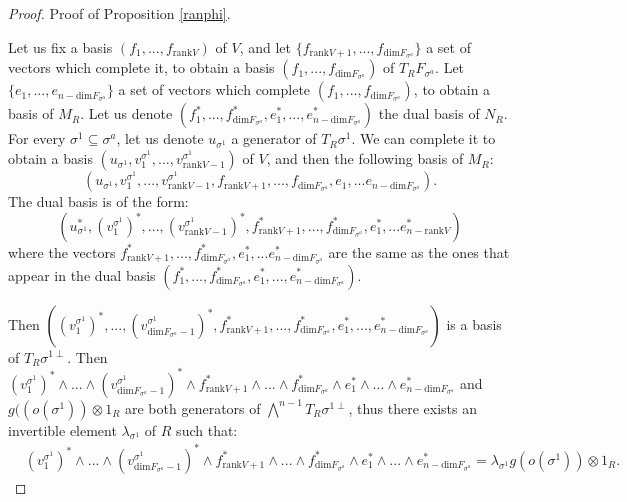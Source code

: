 \documentclass[10pt,a4paper]{amsart}
\begin{document}
\begin{proof}
    Proof of Proposition \ref{ranphi}.
    
    Let us fix a basis $(f_1,...,f_{\mathrm{rank} V})$ of $V$, and let $\{f_{\mathrm{rank}V+1},...,f_{\mathrm{dim}F_{\sigma^a}}\}$ a set of vectors which complete it, to obtain a basis $(f_1,...,f_{\mathrm{dim} F_{\sigma^a}})$ of $T_R F_{\sigma^a}$. Let $\{e_1,...,e_{n-\mathrm{dim}F_{\sigma^a}}\}$ a set of vectors which complete $(f_1,...,f_{\mathrm{dim} F_{\sigma^a}})$, to obtain a basis of $M_R$. Let us denote $(f_1^*,...,f_{\mathrm{dim} F_{\sigma^a}}^*,e_1^*,...,e_{n-\mathrm{dim} F_{\sigma^a}}^*)$ the dual basis of $N_R$. For every $\sigma^1 \subseteq \sigma^a$, let us denote $u_{\sigma^1}$ a generator of $T_R\sigma^1$. We can complete it to obtain a basis $(u_{\sigma^1},v_1^{\sigma^1},...,v_{\mathrm{rank}V -1}^{\sigma^1})$ of $V$, and then the following basis of $M_R$:
    \begin{equation*}
        (u_{\sigma^1},v_1^{\sigma^1},...,v_{\mathrm{rank}V -1}^{\sigma^1},f_{\mathrm{rank}V+1},...,f_{\mathrm{dim}F_{\sigma^a}},e_1,...e_{n-\mathrm{dim}F_{\sigma^a}}).
    \end{equation*}
    The dual basis is of the form:
    \begin{equation*}
        (u_{\sigma^1}^*,(v_1^{\sigma^1})^*,...,(v_{\mathrm{rank}V -1}^{\sigma^1})^*,f_{\mathrm{rank}V+1}^*,...,f_{\mathrm{dim}F_{\sigma^a}}^*,e_1^*,...e_{n-\mathrm{rank}V}^*)
    \end{equation*}
    where the vectors $f_{\mathrm{rank}V+1}^*,...,f_{\mathrm{dim}F_{\sigma^a}}^*,e_1^*,...e_{n-\mathrm{dim}F_{\sigma^a}}^*$ are the same as the ones that appear in the dual basis $(f_1^*,...,f_{\mathrm{dim} F_{\sigma^a}}^*,e_1^*,...,e_{n-\mathrm{dim} F_{\sigma^a}}^*)$.
    
    Then $((v_1^{\sigma^1})^*, ..., (v_{\mathrm{dim}F_{\sigma^a} -1}^{\sigma^1})^*, f_{\mathrm{rank}V+1}^*, ..., f_{\mathrm{dim}F_{\sigma^a}}^*, e_1^* ,..., e_{n-\mathrm{dim}F_{\sigma^a}}^*)$ is a basis of $T_R \sigma^{1\perp}$. Then $(v_1^{\sigma^1})^*\wedge...\wedge(v_{\mathrm{dim}F_{\sigma^a}-1}^{\sigma^1})^*\wedge f_{\mathrm{rank}V+1}^*\wedge...\wedge f_{\mathrm{dim}F_{\sigma^a}} ^*\wedge e_1^*\wedge... \wedge e_{n-\mathrm{dim}F_{\sigma^a}}^*$ and $g((o(\sigma^1)) \otimes 1_R$ are both generators of $\bigwedge^{n-1}T_R\sigma^{1\perp}$, thus there exists an invertible element $\lambda_{\sigma^1}$ of $R$ such that:
    \begin{align*}
        &(v_1^{\sigma^1})^*\wedge...\wedge(v_{\mathrm{dim}F_{\sigma^a} -1}^{\sigma^1})^*\wedge f_{\mathrm{rank}V+1}^* \wedge...\wedge f_{\mathrm{dim}F_{\sigma^a}}^* \wedge e_1^*\wedge... \wedge e_{n-\mathrm{dim}F_{\sigma^a}}^* =\lambda_{\sigma^1} g(o(\sigma^1)) \otimes 1_R.
    \end{align*}


\end{proof}
\end{document}
